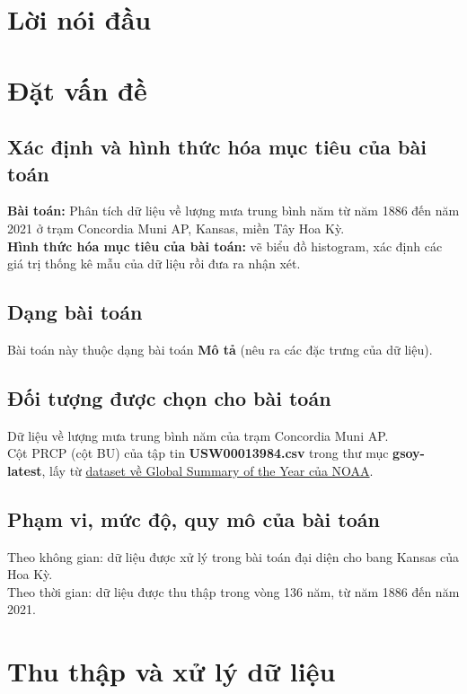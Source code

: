 \documentclass[a4paper]{article}
\begin{document}
\tableofcontents
\listoffigures
\listoftables
\newpage

\section*{Lời nói đầu}

\newpage

\section{Đặt vấn đề}
\subsection{Xác định và hình thức hóa mục tiêu của bài toán}
\textbf{Bài toán:} Phân tích dữ liệu về lượng mưa trung bình năm từ năm 1886 đến năm 2021 ở trạm Concordia Muni AP, Kansas, miền Tây Hoa Kỳ.\\
\textbf{Hình thức hóa mục tiêu của bài toán:} vẽ biểu đồ histogram, xác định các giá trị thống kê mẫu của dữ liệu rồi đưa ra nhận xét.

\subsection{Dạng bài toán}
Bài toán này thuộc dạng bài toán \textbf{Mô tả} (nêu ra các đặc trưng của dữ liệu).

\subsection{Đối tượng được chọn cho bài toán}
Dữ liệu về lượng mưa trung bình năm của trạm Concordia Muni AP.\\
Cột PRCP (cột BU) của tập tin \textbf{USW00013984.csv} trong thư mục \textbf{gsoy-latest}, lấy từ \href{https://www.ncei.noaa.gov/data/gsoy/archive/}{dataset về Global Summary of the Year của NOAA}.

\subsection{Phạm vi, mức độ, quy mô của bài toán}
Theo không gian: dữ liệu được xử lý trong bài toán đại diện cho bang Kansas của Hoa Kỳ.\\
Theo thời gian: dữ liệu được thu thập trong vòng 136 năm, từ năm 1886 đến năm 2021.

\section{Thu thập và xử lý dữ liệu}
\end{document}
